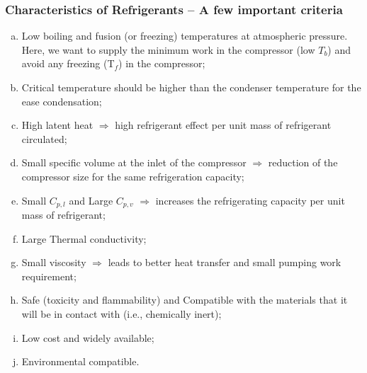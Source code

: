\documentclass[10pt,compress]{beamer}
\begin{document}
\begin{frame}
 \frametitle{Characteristics of Refrigerants -- A few important criteria}
 \begin{enumerate}[(a)]
   \item <1-> Low boiling and fusion (or freezing) temperatures at atmospheric pressure. Here, we want to supply the minimum work in the compressor (low $T_{b}$) and avoid any freezing (T$_{f}$) in the compressor; 
   \item <2-> Critical temperature should be higher than the condenser temperature for the ease condensation;
   \item <3-> High latent heat $\Longrightarrow$ high refrigerant effect per unit mass of refrigerant circulated;
   \item <4-> Small specific volume at the inlet of the compressor $\Longrightarrow$ reduction of the compressor size for the same refrigeration capacity;
   \item <5-> Small $C_{p,l}$ and Large $C_{p,v}$ $\Longrightarrow$ increases the refrigerating capacity per unit mass of refrigerant;
   \item <6-> Large Thermal conductivity;
   \item <7-> Small viscosity $\Longrightarrow$ leads to better heat transfer and small pumping work requirement;
   \item <8-> Safe (toxicity and flammability) and Compatible with the materials that it will be in contact with (i.e., chemically inert);
   \item <10-> Low cost and widely available;
   \item <11-> Environmental compatible.
  \end{enumerate}
\end{frame}
\end{document}
